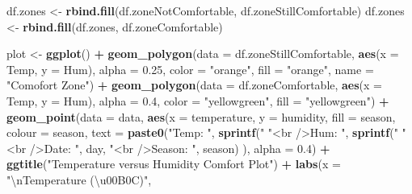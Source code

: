 \documentclass[
  a4paperpaper,
]{book}
\newenvironment{Shaded}{\begin{snugshade}}{\end{snugshade}}
\newcommand{\CharTok}[1]{\textcolor[rgb]{0.31,0.60,0.02}{#1}}
\newcommand{\DataTypeTok}[1]{\textcolor[rgb]{0.13,0.29,0.53}{#1}}
\newcommand{\FloatTok}[1]{\textcolor[rgb]{0.00,0.00,0.81}{#1}}
\newcommand{\KeywordTok}[1]{\textcolor[rgb]{0.13,0.29,0.53}{\textbf{#1}}}
\newcommand{\NormalTok}[1]{#1}
\newcommand{\OperatorTok}[1]{\textcolor[rgb]{0.81,0.36,0.00}{\textbf{#1}}}
\newcommand{\StringTok}[1]{\textcolor[rgb]{0.31,0.60,0.02}{#1}}
\let\oldShaded\Shaded
\let\endoldShaded\endShaded
\renewenvironment{Shaded}{\footnotesize\oldShaded}{\endoldShaded}
\begin{document}
\begin{Shaded}
\begin{Highlighting}[]
{{{{{\NormalTok{df.zones <-}\StringTok{ }\KeywordTok{rbind.fill}\NormalTok{(df.zoneNotComfortable, df.zoneStillComfortable)}
\NormalTok{df.zones <-}\StringTok{ }\KeywordTok{rbind.fill}\NormalTok{(df.zones, df.zoneComfortable)}

\NormalTok{plot <-}\StringTok{ }\KeywordTok{ggplot}\NormalTok{() }\OperatorTok{+}
\StringTok{  }\KeywordTok{geom_polygon}\NormalTok{(}\DataTypeTok{data =}\NormalTok{ df.zoneStillComfortable,}
               \KeywordTok{aes}\NormalTok{(}\DataTypeTok{x =}\NormalTok{ Temp,}
                   \DataTypeTok{y =}\NormalTok{ Hum),}
               \DataTypeTok{alpha =} \FloatTok{0.25}\NormalTok{,}
               \DataTypeTok{color =} \StringTok{"orange"}\NormalTok{,}
               \DataTypeTok{fill =} \StringTok{"orange"}\NormalTok{,}
               \DataTypeTok{name =} \StringTok{"Comofort Zone"}\NormalTok{) }\OperatorTok{+}
\StringTok{  }\KeywordTok{geom_polygon}\NormalTok{(}\DataTypeTok{data =}\NormalTok{ df.zoneComfortable,}
               \KeywordTok{aes}\NormalTok{(}\DataTypeTok{x =}\NormalTok{ Temp,}
                   \DataTypeTok{y =}\NormalTok{ Hum),}
               \DataTypeTok{alpha =} \FloatTok{0.4}\NormalTok{,}
               \DataTypeTok{color =} \StringTok{"yellowgreen"}\NormalTok{,}
               \DataTypeTok{fill =} \StringTok{"yellowgreen"}\NormalTok{) }\OperatorTok{+}
\StringTok{    }\KeywordTok{geom_point}\NormalTok{(}\DataTypeTok{data =}\NormalTok{ data,}
             \KeywordTok{aes}\NormalTok{(}\DataTypeTok{x =}\NormalTok{ temperature,}
                 \DataTypeTok{y =}\NormalTok{ humidity,}
                 \DataTypeTok{fill =}\NormalTok{ season,}
                 \DataTypeTok{colour =}\NormalTok{ season,}
                 \DataTypeTok{text =} \KeywordTok{paste0}\NormalTok{(}\StringTok{"Temp:    "}\NormalTok{, }\KeywordTok{sprintf}\NormalTok{(}\StringTok{"%
                                 \StringTok{"<br />Hum:     "}\NormalTok{, }\KeywordTok{sprintf}\NormalTok{(}\StringTok{"%
                                 \StringTok{"<br />Date:     "}\NormalTok{, day,}
                                 \StringTok{"<br />Season: "}\NormalTok{, season)}
\NormalTok{                 ),}
             \DataTypeTok{alpha =} \FloatTok{0.4}\NormalTok{) }\OperatorTok{+}
\StringTok{  }\KeywordTok{ggtitle}\NormalTok{(}\StringTok{"Temperature versus Humidity Comfort Plot"}\NormalTok{) }\OperatorTok{+}
\StringTok{  }\KeywordTok{labs}\NormalTok{(}\DataTypeTok{x =} \StringTok{"}\CharTok{\textbackslash{}n}\StringTok{Temperature (\textbackslash{}u00B0C)"}\NormalTok{,}
}}}}}}}
\end{Highlighting}
\end{Shaded}
\end{document}
